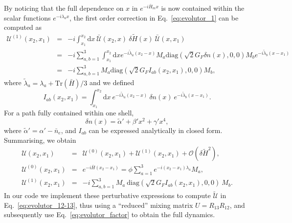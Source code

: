 \documentclass[11pt,a4paper]{article}
\newcommand{\de}[0]{\text{d}}
\begin{document}
By noticing that the full dependence on $x$ in $e^{-i \bar{H}_m x}$ is now contained within the scalar functions $e^{- i \lambda_a x}$, the first order correction in Eq.~\ref{eq:evolutor_1} can be computed as
\begin{eqnarray}
\mathcal{U}^{(1)}(x_2,x_1) &=&	- i \int_{x_1}^{x_2} \de x\ \bar{\mathcal{U}}(x_2,x)\ \delta \tilde{H}(x)\ \bar{\mathcal{U}}(x,x_1) \\
&=& - i \sum_{a,b=1}^3 \int_{x_1}^{x_2} \de x e^{- i \tilde{\lambda}_a (x_2-x)} M_a \text{diag}\left(\sqrt{2} G_F \delta n(x),0,0\right) M_b e^{- i \tilde{\lambda}_b (x-x_1)}\\
&=& - i \sum_{a,b=1}^3 M_a \text{diag}\left(\sqrt{2}G_F I_{ab}(x_2, x_1), 0, 0\right) M_b,
\end{eqnarray}
where  $\tilde{\lambda}_a = \lambda_a + \text{Tr}(\bar{H})/3$ and we defined
\begin{equation}
	I_{ab}(x_2,x_1) = \int_{x_1}^{x_2}\de x\ e^{- i \tilde{\lambda}_a (x_2-x)}\ \delta n(x)\ e^{- i \tilde{\lambda}_b (x-x_1)}.
\end{equation}
For a path fully contained within one shell, 
\begin{equation}
	\delta n (x) = \tilde{\alpha}' + \beta' x^2 + \gamma' x^4,
\end{equation}
where $\tilde{\alpha}' = \alpha' - \bar{n}_e$, and $I_{ab}$ can be expressed analytically in closed form.
Summarising, we obtain
\begin{eqnarray}
\mathcal{U}(x_2,x_1) &=& \mathcal{U}^{(0)}(x_2,x_1) +\mathcal{U}^{(1)}(x_2,x_1) + \mathcal{O}(\delta \tilde{H}^2),\\
\mathcal{U}^{(0)}(x_2,x_1) &=& 	e^{- i \bar{H} (x_2-x_1)} = \phi \sum_{a=1}^3 e^{-i (x_2-x_1) \lambda_a} M_a, \\ %
\mathcal{U}^{(1)}(x_2,x_1) &=& - i \sum_{a,b=1}^3 M_a\ \text{diag}\left(\sqrt{2}G_F I_{ab}(x_2, x_1), 0, 0\right)\ M_b.
\end{eqnarray}
In our code we implement these perturbative expressions to compute $\tilde{\mathcal{U}}$ in Eq.~\ref{eq:evolutor_12-13}, thus using a ``reduced'' mixing matrix $U = R_{13} R_{12}$, and subsequently use Eq.~\ref{eq:evolutor_factor} to obtain the full dynamics.
\end{document}
